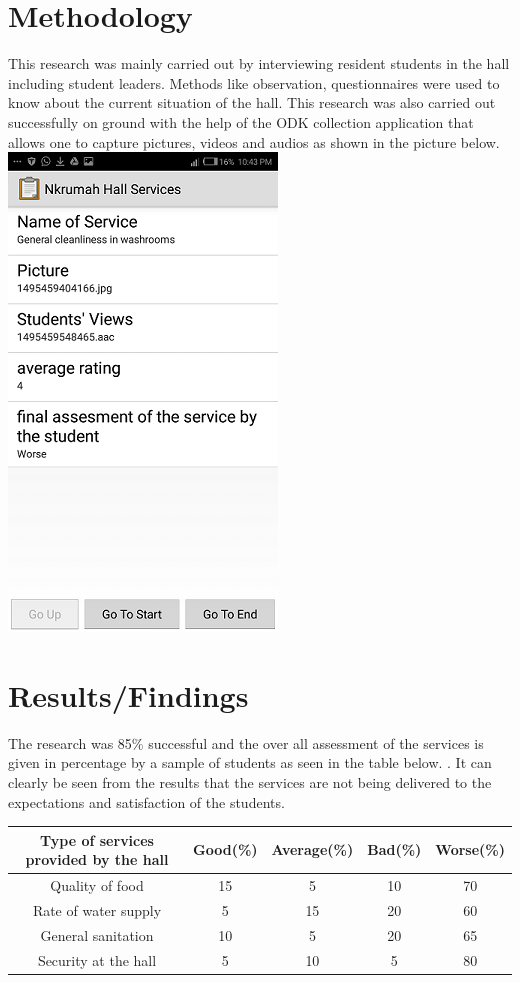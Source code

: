 \documentclass[12pt, a4paper]{article}
\begin{document}
\section{Methodology}
This research was mainly carried out by interviewing resident students in the hall including student leaders. Methods like observation, questionnaires were used to know about the current situation of the hall. This research was also carried out successfully on ground with the help of the ODK collection application that allows one to capture pictures, videos and audios as shown in the picture below.\\
\includegraphics{ODKImage}
\section{Results/Findings}
The research was 85\% successful and the over all assessment of the services is given in percentage by a sample of students as seen in the table below.  . It can clearly be seen from the results that the services are not being delivered to the expectations and satisfaction of the students.


\begin{center}
\begin{tabular}{|| c | c | c | c | c ||}
\hline \textbf{Type of services provided by the hall} & \textbf{Good(\%)}  & \textbf{Average(\%)}  & \textbf{Bad(\%)}  & \textbf{Worse(\%)}\\
[0.5ex]
\hline
\hline Quality of food & 15 & 5 & 10 & 70\\
\hline Rate of water supply & 5 & 15 & 20 & 60\\
\hline General sanitation	  & 10 & 5 & 20 & 65\\
\hline Security at the hall &5 & 10 & 5 & 80\\
[0.5ex]
\hline 
\end{tabular}
\end{center}
\end{document}
